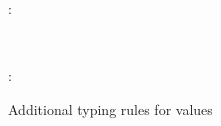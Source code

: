 \begin{figure}
\flushleft \shadebox{$\Gamma \vdash \delta: \Delta$}
\begin{smathpar}
   {
      \Gamma {}: \Delta
   }
\end{smathpar}
\\[5mm]
\flushleft {}
\begin{smathpar}
{
   \vdash \exClosure{\rho}{\delta}{\sigma}: 
}
\end{smathpar}
\caption{Additional typing rules for values}
\end{figure}
